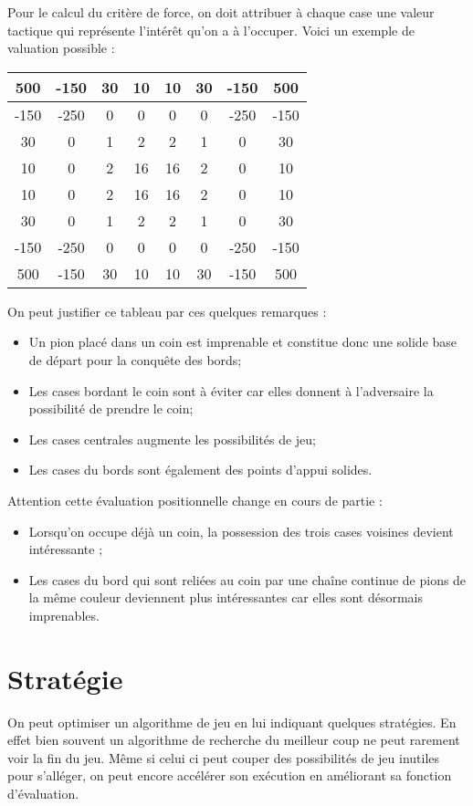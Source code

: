 \documentclass[10pt,a4paper]{report}
\begin{document}
Pour le calcul du critère de force, on doit attribuer à chaque case une valeur tactique qui représente l’intérêt qu’on a à l’occuper. Voici un exemple de valuation possible :
\begin{center}
\begin{tabular}{|c|c|c|c|c|c|c|c|}
\hline 
500 & -150 & 30 & 10 & 10 & 30 & -150 & 500 \\ 
\hline 
-150 & -250 & 0 & 0 & 0 & 0 & -250 & -150 \\ 
\hline 
30 & 0 & 1 & 2 & 2 & 1 & 0 & 30 \\ 
\hline 
10 & 0 & 2 & 16 & 16 & 2 & 0 & 10 \\ 
\hline 
10 & 0 & 2 & 16 & 16 & 2 & 0 & 10 \\ 
\hline 
30 & 0 & 1 & 2 & 2 & 1 & 0 & 30 \\ 
\hline 
-150 & -250 & 0 & 0 & 0 & 0 & -250 & -150 \\ 
\hline 
500 & -150 & 30 & 10 & 10 & 30 & -150 & 500 \\ 
\hline 
\end{tabular}
\end{center}

On peut justifier ce tableau par ces quelques remarques :
\begin{itemize}
\item Un pion placé dans un coin est imprenable et constitue donc une solide base de départ pour la conquête des bords;
\item Les cases bordant le coin sont à éviter car elles donnent à l’adversaire la possibilité de prendre le coin;
\item Les cases centrales augmente les possibilités de jeu;
\item Les cases du bords sont également des points d’appui solides.
\end{itemize}

Attention cette évaluation positionnelle change en cours de partie :
\begin{itemize}
\item Lorsqu’on occupe déjà un coin, la possession des trois cases voisines devient intéressante ;
\item Les cases du bord qui sont reliées au coin par une chaîne continue de pions de la même couleur deviennent plus intéressantes car elles sont désormais imprenables.
\end{itemize}

\section{Stratégie}
On peut optimiser un algorithme de jeu en lui indiquant quelques stratégies.
En effet bien souvent un algorithme de recherche du meilleur coup ne peut rarement voir la fin du jeu. Même si celui ci peut couper des possibilités de jeu inutiles pour s'alléger, on peut encore accélérer son exécution en améliorant sa fonction d'évaluation.
\end{document}
